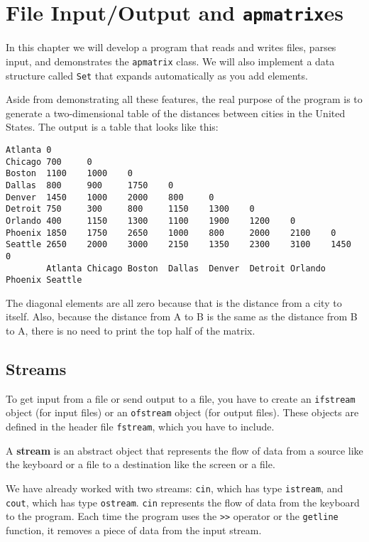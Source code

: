 

\chapter{File Input/Output and {\tt apmatrix}es}

In this chapter we will develop a program that reads and writes files,
parses input, and demonstrates the {\tt apmatrix} class.  We will also
implement a data structure called {\tt Set} that expands automatically
as you add elements.

Aside from demonstrating all these features, the real purpose of the
program is to generate a two-dimensional table of
the distances between cities in the United States.
The output is a table that looks like this:

\begin{verbatim}
Atlanta 0
Chicago 700     0
Boston  1100    1000    0
Dallas  800     900     1750    0
Denver  1450    1000    2000    800     0
Detroit 750     300     800     1150    1300    0
Orlando 400     1150    1300    1100    1900    1200    0
Phoenix 1850    1750    2650    1000    800     2000    2100    0
Seattle 2650    2000    3000    2150    1350    2300    3100    1450    0
        Atlanta Chicago Boston  Dallas  Denver  Detroit Orlando Phoenix Seattle
\end{verbatim}
%
The diagonal elements are all zero because that is the distance
from a city to itself.  Also, because
the distance from A to B is the same as the distance from B
to A, there is no need to print the top half of the matrix.

\section {Streams}

To get input from a file or send output to a file, you have to
create an {\tt ifstream} object (for input files) or an
{\tt ofstream} object (for output files).  These objects
are defined in the header file {\tt fstream}, which you
have to include.


A {\bf stream} is an abstract object that represents the flow
of data from a source like the keyboard or a file to a destination
like the screen or a file.

We have already worked with two streams: {\tt cin}, which has type
{\tt istream}, and {\tt cout}, which has type {\tt ostream}.
{\tt cin} represents the flow of data from the keyboard to
the program.  Each time the program uses the {\tt >>} operator
or the {\tt getline} function, it removes a piece of data
from the input stream.


